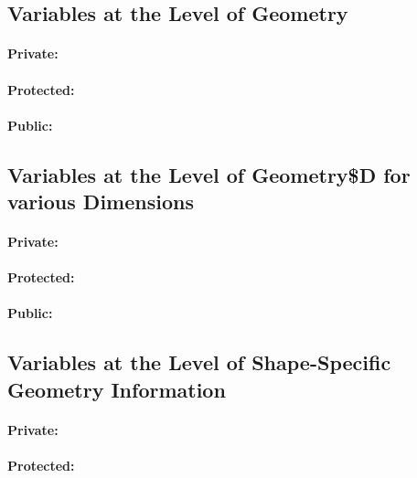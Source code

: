 \subsection{Variables at the Level of Geometry}

\paragraph{Private:}

\paragraph{Protected:}

\paragraph{Public:}


\subsection{Variables at the Level of Geometry\$D for various Dimensions}

\paragraph{Private:}

\paragraph{Protected:}

\paragraph{Public:}

\subsection{Variables at the Level of Shape-Specific Geometry Information}

\paragraph{Private:}

\paragraph{Protected:}

